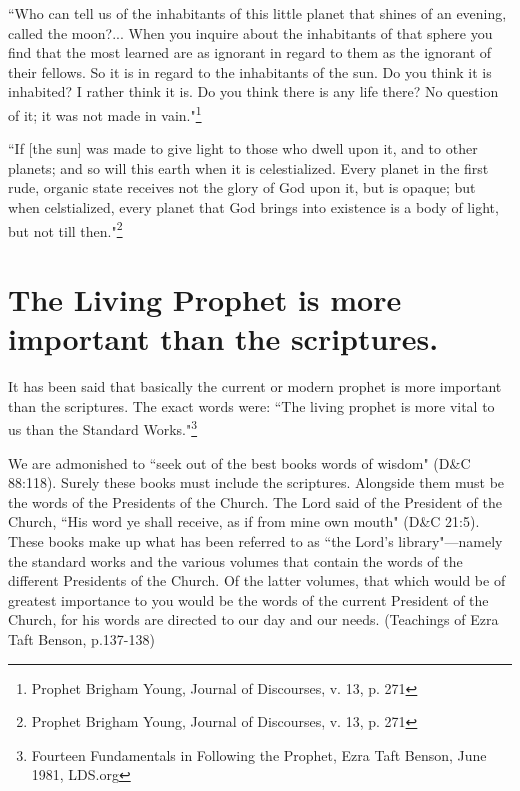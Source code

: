 \begin{displayquote}
``Who can tell us of the inhabitants of this little planet that shines of an evening,
called the moon?... When you inquire about the inhabitants of that sphere you find 
that the most learned are as ignorant in regard to them as the ignorant of their 
fellows. So it is in regard to the inhabitants of the sun. Do you think it is 
inhabited? I rather think it is. Do you think there is any life there? No question 
of it; it was not made in vain."\footnote{
Prophet Brigham Young, Journal of Discourses, v. 13, p. 271
}
\end{displayquote}

\begin{displayquote}
``If [the sun] was made to give light to those who dwell upon it, and to other
planets; and so will this earth when it is celestialized. Every planet in the first 
rude, organic state receives not the glory of God upon it, but is opaque; but when 
celstialized, every planet that God brings into existence is a body of light, but 
not till then."\footnote{
Prophet Brigham Young, Journal of Discourses, v. 13, p. 271
}
\end{displayquote}

\section{The Living Prophet is more important than the scriptures.}

It has been said that basically the current or modern prophet is more important than
the scriptures. The exact words were: 
``The living prophet is more vital to us than the Standard Works."\footnote{Fourteen 
Fundamentals in Following the Prophet, Ezra Taft Benson, June 1981, LDS.org}

\begin{displayquote}
We are admonished to ``seek out of the best books words of wisdom" (D\&C 88:118). 
Surely these books must include the scriptures. Alongside them must be the words of 
the Presidents of the Church. The Lord said of the President of the Church, ``His 
word ye shall receive, as if from mine own mouth" (D\&C 21:5). These books make up 
what has been referred to as ``the Lord’s library"—namely the standard works and 
the various volumes that contain the words of the different Presidents of the Church. 
Of the latter volumes, that which would be of greatest importance to you would be 
the words of the current President of the Church, for his words are directed to our 
day and our needs. (Teachings of Ezra Taft Benson, p.137-138)
\end{displayquote}

